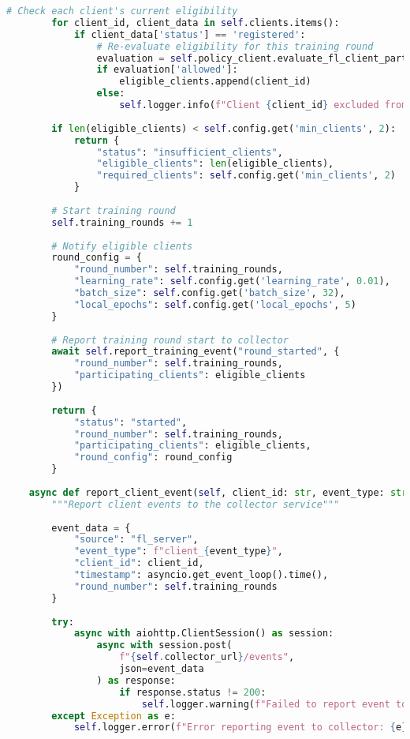 \begin{lstlisting}[language=python, caption=Extended FL Server Implementation]
        # Check each client's current eligibility
        for client_id, client_data in self.clients.items():
            if client_data['status'] == 'registered':
                # Re-evaluate eligibility for this training round
                evaluation = self.policy_client.evaluate_fl_client_participation(client_data)
                if evaluation['allowed']:
                    eligible_clients.append(client_id)
                else:
                    self.logger.info(f"Client {client_id} excluded from round: {evaluation['reason']}")
        
        if len(eligible_clients) < self.config.get('min_clients', 2):
            return {
                "status": "insufficient_clients",
                "eligible_clients": len(eligible_clients),
                "required_clients": self.config.get('min_clients', 2)
            }
        
        # Start training round
        self.training_rounds += 1
        
        # Notify eligible clients
        round_config = {
            "round_number": self.training_rounds,
            "learning_rate": self.config.get('learning_rate', 0.01),
            "batch_size": self.config.get('batch_size', 32),
            "local_epochs": self.config.get('local_epochs', 5)
        }
        
        # Report training round start to collector
        await self.report_training_event("round_started", {
            "round_number": self.training_rounds,
            "participating_clients": eligible_clients
        })
        
        return {
            "status": "started",
            "round_number": self.training_rounds,
            "participating_clients": eligible_clients,
            "round_config": round_config
        }
    
    async def report_client_event(self, client_id: str, event_type: str):
        """Report client events to the collector service"""
        
        event_data = {
            "source": "fl_server",
            "event_type": f"client_{event_type}",
            "client_id": client_id,
            "timestamp": asyncio.get_event_loop().time(),
            "round_number": self.training_rounds
        }
        
        try:
            async with aiohttp.ClientSession() as session:
                async with session.post(
                    f"{self.collector_url}/events",
                    json=event_data
                ) as response:
                    if response.status != 200:
                        self.logger.warning(f"Failed to report event to collector: {response.status}")
        except Exception as e:
            self.logger.error(f"Error reporting event to collector: {e}")
    

\end{lstlisting}
